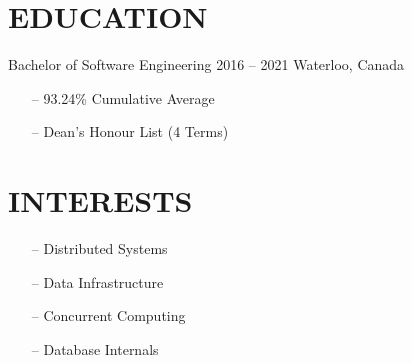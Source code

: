 \documentclass{resume}
\begin{document}
\begin{sidebar}
    \section{EDUCATION}
      \color{tagText}Bachelor of Software Engineering
      \color{subTagText}2016 -- 2021 \separator\color{subTagText}Waterloo, Canada
      \color{bodyText}%
      \begin{itemize}[leftmargin=0.45cm, noitemsep, topsep=0.0cm]%
        \item[--] 93.24\% Cumulative Average
        \item[--] Dean's Honour List (4 Terms)
      \end{itemize}%
    \section{INTERESTS}
      \begin{itemize}[leftmargin=0.45cm, noitemsep, topsep=0.0cm]%
        \item[--] Distributed Systems
        \item[--] Data Infrastructure
        \item[--] Concurrent Computing
        \item[--] Database Internals
      \end{itemize}%
  \end{sidebar}
\end{document}
